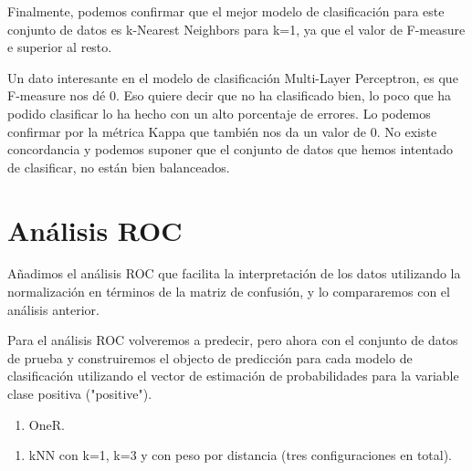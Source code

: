 \documentclass[]{article}
\newenvironment{Shaded}{\begin{snugshade}}{\end{snugshade}}
\newcommand{\DataTypeTok}[1]{\textcolor[rgb]{0.13,0.29,0.53}{#1}}
\newcommand{\KeywordTok}[1]{\textcolor[rgb]{0.13,0.29,0.53}{\textbf{#1}}}
\newcommand{\NormalTok}[1]{#1}
\newcommand{\OperatorTok}[1]{\textcolor[rgb]{0.81,0.36,0.00}{\textbf{#1}}}
\newcommand{\StringTok}[1]{\textcolor[rgb]{0.31,0.60,0.02}{#1}}
\providecommand{\tightlist}{%
  \setlength{\itemsep}{0pt}\setlength{\parskip}{0pt}}
\begin{document}
Finalmente, podemos confirmar que el mejor modelo de clasificación para este conjunto de datos es k-Nearest Neighbors para k=1, ya que el valor de F-measure e superior al resto.

Un dato interesante en el modelo de clasificación Multi-Layer Perceptron, es que F-measure nos dé 0. Eso quiere decir que no ha clasificado bien, lo poco que ha podido clasificar lo ha hecho con un alto porcentaje de errores. Lo podemos confirmar por la métrica Kappa que también nos da un valor de 0. No existe concordancia y podemos suponer que el conjunto de datos que hemos intentado de clasificar, no están bien balanceados.

\hypertarget{anuxe1lisis-roc}{%
\section{Análisis ROC}\label{anuxe1lisis-roc}}

Añadimos el análisis ROC que facilita la interpretación de los datos utilizando la normalización en términos de la matriz de confusión, y lo compararemos con el análisis anterior. 

Para el análisis ROC volveremos a predecir, pero ahora con el conjunto de datos de prueba y construiremos el objecto de predicción para cada modelo de clasificación utilizando el vector de estimación de probabilidades para la variable clase positiva ("positive").

\newpage

\begin{enumerate}
\def\labelenumi{\arabic{enumi}.}
\tightlist
\item
  OneR.
\end{enumerate}

\begin{Shaded}
\end{Shaded}

\begin{enumerate}
\def\labelenumi{\arabic{enumi}.}
\setcounter{enumi}{1}
\tightlist
\item
  kNN con k=1, k=3 y con peso por distancia (tres configuraciones en total).
\end{enumerate}
\end{document}
